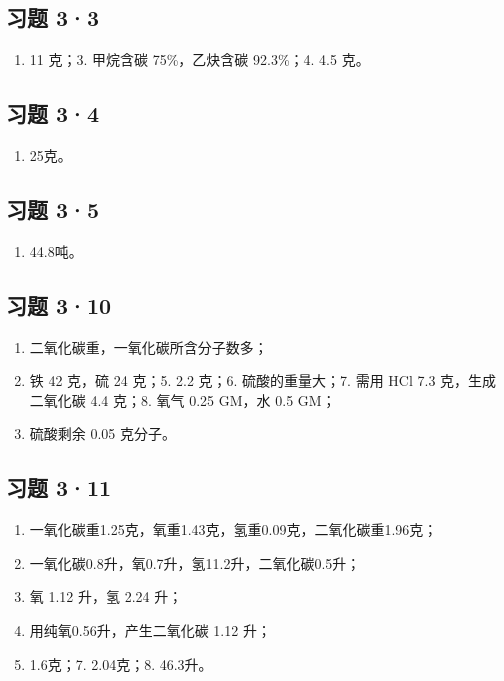 \subsection{习题 3·3}

\begin{enumerate}[start=2]
\item
  11 克；3. 甲烷含碳 75\%，乙炔含碳 92.3\%；4. 4.5 克。
\end{enumerate}

\subsection{习题 3·4}

\begin{enumerate}[start=9]
\item
  25克。
\end{enumerate}

\subsection{习题 3·5}

\begin{enumerate}[start=3]
\item
  44.8吨。
\end{enumerate}

\subsection{习题 3·10}

\begin{enumerate}[start=3]
\item
  二氧化碳重，一氧化碳所含分子数多；
\item
  铁 42 克，硫 24 克；5. 2.2 克；6. 硫酸的重量大；7. 需用 HCl 7.3
  克，生成二氧化碳 4.4 克；8. 氧气 0.25 GM，水 0.5 GM；
\item
  硫酸剩余 0.05 克分子。
\end{enumerate}

\subsection{习题 3·11}

\begin{enumerate}[start=2]
\item
  一氧化碳重1.25克，氧重1.43克，氢重0.09克，二氧化碳重1.96克；
\item
  一氧化碳0.8升，氧0.7升，氢11.2升，二氧化碳0.5升；
\item
  氧 1.12 升，氢 2.24 升；
\item
  用纯氧0.56升，产生二氧化碳 1.12 升；
\item
  1.6克；7. 2.04克；8. 46.3升。
\end{enumerate}


